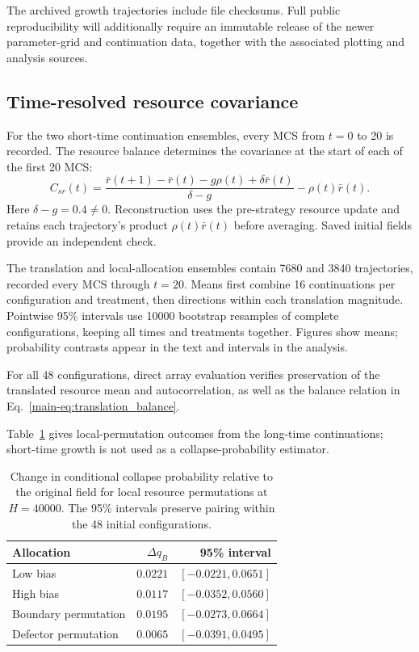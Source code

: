 The archived growth trajectories include file checksums. Full public reproducibility will additionally require an immutable release of the newer parameter-grid and continuation data, together with the associated plotting and analysis sources.

\subsection{Time-resolved resource covariance}

For the two short-time continuation ensembles, every MCS from $t=0$ to 20 is recorded. The resource balance determines the covariance at the start of each of the first 20 MCS:
\begin{equation}
\label{eq:reconstruct_covariance}
C_{sr}(t)=
\frac{\bar r(t+1)-\bar r(t)-g\rho(t)+\delta\bar r(t)}
{\delta-g}
-\rho(t)\bar r(t).
\end{equation}
Here $\delta-g=0.4\ne0$. Reconstruction uses the pre-strategy resource update and retains each trajectory's product $\rho(t)\bar r(t)$ before averaging. Saved initial fields provide an independent check.

The translation and local-allocation ensembles contain 7680 and 3840 trajectories, recorded every MCS through $t=20$. Means first combine 16 continuations per configuration and treatment, then directions within each translation magnitude. Pointwise 95\% intervals use 10000 bootstrap resamples of complete configurations, keeping all times and treatments together. Figures show means; probability contrasts appear in the text and intervals in the analysis.

For all 48 configurations, direct array evaluation verifies preservation of the translated resource mean and autocorrelation, as well as the balance relation in Eq.~\eqref{main-eq:translation_balance}.

Table~\ref{tab:local_risk} gives local-permutation outcomes from the long-time continuations; short-time growth is not used as a collapse-probability estimator.

\begin{table}[t]
\caption{Change in conditional collapse probability relative to the original field for local resource permutations at $H=40000$. The 95\% intervals preserve pairing within the 48 initial configurations.}
\label{tab:local_risk}
\centering
\begin{tabular}{lrr}
\toprule
Allocation & $\Delta q_B$ & 95\% interval \\
\midrule
Low bias & $0.0221$ & $[-0.0221,0.0651]$ \\
High bias & $0.0117$ & $[-0.0352,0.0560]$ \\
Boundary permutation & $0.0195$ & $[-0.0273,0.0664]$ \\
Defector permutation & $0.0065$ & $[-0.0391,0.0495]$ \\
\bottomrule
\end{tabular}
\end{table}

